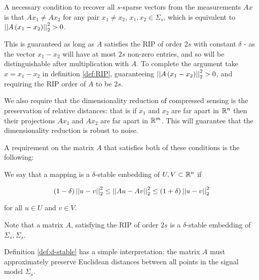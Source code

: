 \begin{remark} 
A necessary condition to recover all \(s\)-sparse vectors from the measurements \(Ax\) is that \(Ax_1 \neq Ax_2\) for any pair \( x_1 \neq x_2\), \(x_1, x_2 \in \Sigma_s\), which is equivalent to \(\left|\left|A\left(x_1 - x_2\right)\right|\right|_2^2 > 0\). 

This is guaranteed as long as \(A\) satisfies the RIP of order 2\(s\) with constant \(\delta\) - as the vector \(x_1 - x_2\) will have at most \(2s\) non-zero entries, and so will be distinguishable after multiplication with \(A\). To complete the argument take \(x = x_1 - x_2\) in definition \ref{def:RIP}, guaranteeing \(\left|\left|A\left(x_1 - x_2\right)\right|\right|_2^2 > 0 \), and requiring the RIP order of \(A\) to be \(2s\).
\end{remark}

\begin{remark} [Stability]
We also require that the dimensionality reduction of compressed sensing is the preservation of relative distances: that is if \(x_1\) and \(x_2\) are far apart in \({\mathbb{R}}^n\) then their projections \(Ax_1\) and \(Ax_2\) are far apart in \({\mathbb{R}}^m\). This will guarantee that the dimensionality reduction is robust to noise. 
\end{remark}

A requirement on the matrix \(A\) that satisfies both of these conditions is the following:

\begin{definition}
We say that a mapping is a \(\delta\)-stable embedding of \(U,V \subset {\mathbb{R}}^n\) if

\begin{equation}
\left(1 - \delta \right) \left|\left|u-v\right|\right|_2^2 \leq \left|\left|Au-Av\right|\right|_2^2 \leq \left(1 + \delta\right) \left|\left|u-v\right|\right|_2^2
\end{equation}

for all \(u \in U\) and \(v \in V\). 
\label{def:d-stable}
\end{definition} 

\begin{remark}
Note that a matrix \(A\), satisfying the RIP of order \(2s\) is a \(\delta\)-stable embedding of \(\Sigma_s, \Sigma_s\). 
\end{remark}

\begin{remark}
Definition \ref{def:d-stable} has a simple interpretation: the matrix \(A\) must approximately preserve Euclidean distances between all points in the signal model \(\Sigma_s\).
\end{remark}

